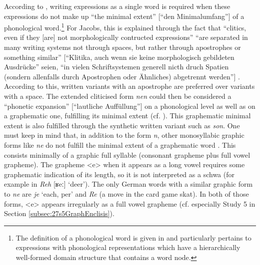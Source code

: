 According to \citet[99]{Jacobs2005}, writing expressions as a single word is required when these expressions do not make up ``the minimal extent'' [``den Minimalumfang''] of a phonological word.\footnote{
	The definition of a phonological word is given in \citet[22]{Jacobs2005} and particularly pertains to expressions with phonological representations which have a hierarchically well-formed domain structure that contains a word node.}
For Jacobs, this is explained through the fact that ``clitics, even if they [are] not morphologically contructed expressions'' ``are separated in many writing systems not through spaces, but rather through apostrophes or something similar'' [``Klitika, auch wenn sie keine morphologisch gebildeten Ausdrücke'' seien, ``in vielen Schriftsystemen generell nicth druch Spatien (sondern allenfalls durch Apostrophen oder Ähnliches) abgetrennt werden''] \citep[99]{Jacobs2005}.
According to this, written variants with an apostrophe are preferred over variants with a space.
The extended cliticised form \textit{nen} could then be considered a ``phonetic expansion'' [``lautliche Auffüllung''] \citep[188]{Vogel2006} on a phonological level as well as on a graphematic one, fulfilling its minimal extent (cf. \citealt{Jacobs2005}).
This graphematic minimal extent is also fulfilled through the synthetic written variant such as \textit{son}.
One must keep in mind that, in addition to the form \textit{n}, other monosyllabic graphic forms like \textit{ne} do not fulfill the minimal extent of a graphematic word \citep[198]{Fuhrhop2008}.
This consists minimally of a graphic full syllable (consonant grapheme plus full vowel grapheme).
The grapheme <e> when it appears as a long vowel requires some graphematic indication of its length, so it is not interpreted as a schwa (for example in \textit{Reh} [ʁeː] `deer').
The only German words with a similar graphic form to \textit{ne} are \textit{je} `each, per' and \textit{Re} (a move in the card game skat).
In both of those forms, <e> appears irregularly as a full vowel grapheme (cf. especially Study 5 in Section \ref{subsec:27s5GraphEnclisis}).

